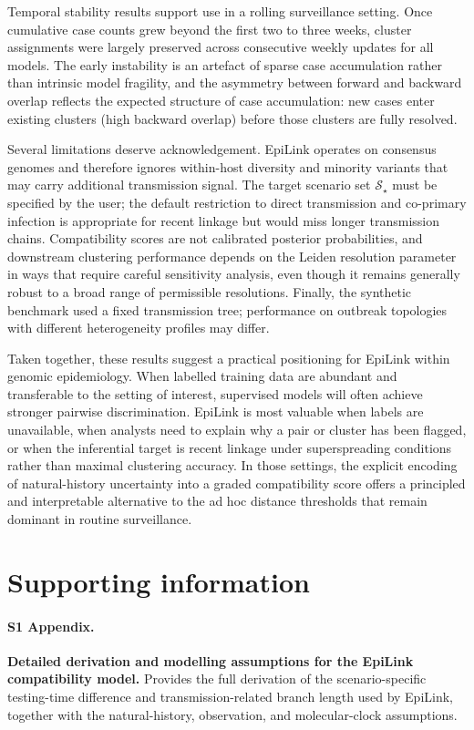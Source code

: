 \documentclass[10pt,letterpaper]{article}
\begin{document}
Temporal stability results support use in a rolling surveillance setting. Once cumulative case counts grew beyond the first two to three weeks, cluster assignments were largely preserved across consecutive weekly updates for all models. The early instability is an artefact of sparse case accumulation rather than intrinsic model fragility, and the asymmetry between forward and backward overlap reflects the expected structure of case accumulation: new cases enter existing clusters (high backward overlap) before those clusters are fully resolved.

Several limitations deserve acknowledgement. EpiLink operates on consensus genomes and therefore ignores within-host diversity and minority variants that may carry additional transmission signal. The target scenario set
$\mathcal{S}_\star$ must be specified by the user; the default restriction to direct transmission and co-primary infection is appropriate for recent linkage but would miss longer transmission chains. Compatibility scores are not
calibrated posterior probabilities, and downstream clustering performance depends on the Leiden resolution parameter in ways that require careful sensitivity analysis, even though it remains generally robust to a broad range of permissible resolutions. Finally, the synthetic benchmark used a fixed transmission tree; performance on outbreak topologies with different heterogeneity profiles may differ.

Taken together, these results suggest a practical positioning for EpiLink within genomic epidemiology. When labelled training data are abundant and transferable to the setting of interest, supervised models will often achieve stronger
pairwise discrimination. EpiLink is most valuable when labels are unavailable, when analysts need to explain why a pair or cluster has been flagged, or when the inferential target is recent linkage under superspreading conditions rather than maximal clustering accuracy. In those settings, the explicit encoding of natural-history uncertainty into a graded compatibility score offers a principled and interpretable alternative to the ad hoc distance thresholds that remain dominant in routine surveillance.

\section*{Supporting information}

\paragraph*{S1 Appendix.}
\label{par:S1_Appendix}
\textbf{Detailed derivation and modelling assumptions for the EpiLink compatibility model.}
Provides the full derivation of the scenario-specific testing-time difference and transmission-related branch length used by EpiLink, together with the natural-history, observation, and molecular-clock assumptions.
\end{document}
